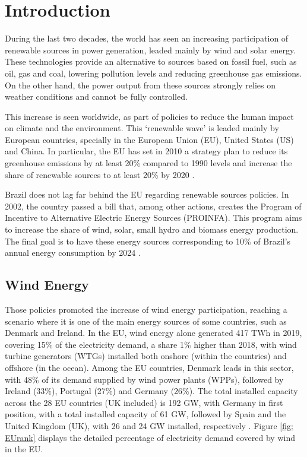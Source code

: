 \chapter[Introduction]{Introduction}
\label{ch: Intro}

During the last two decades, the world has seen an increasing participation of renewable sources in power generation, leaded mainly by wind and solar energy. These technologies provide an alternative to sources based on fossil fuel, such as oil, gas and coal, lowering pollution levels and reducing greenhouse gas emissions. On the other hand, the power output from these sources strongly relies on weather conditions and cannot be fully controlled.

This increase is seen worldwide, as part of policies to reduce the human impact on climate and the environment. This `renewable wave' is leaded mainly by European countries, specially in the European Union (EU), United States (US) and China. In particular, the EU has set in 2010 a strategy plan to reduce its greenhouse emissions by at least 20\% compared to 1990 levels and increase the share of renewable sources to at least 20\% by 2020 \cite{Europe2020}.

Brazil does not lag far behind the EU regarding renewable sources policies. In 2002, the country passed a bill that, among other actions, creates the Program of Incentive to Alternative Electric Energy Sources (PROINFA). This program aims to increase the share of wind, solar, small hydro and biomass energy production. The final goal is to have these energy sources corresponding to 10\% of Brazil's annual energy consumption by 2024 \cite{Brazil2002}.

\section{Wind Energy}

Those policies promoted the increase of wind energy participation, reaching a scenario where it is one of the main energy sources of some countries, such as Denmark and Ireland. In the EU, wind energy alone generated 417 TWh in 2019, covering 15\% of the electricity demand, a share 1\% higher than 2018, with wind turbine generators (WTGs) installed both onshore (within the countries) and offshore (in the ocean). Among the EU countries, Denmark leads in this sector, with 48\% of its demand supplied by wind power plants (WPPs), followed by Ireland (33\%), Portugal (27\%) and Germany (26\%). The total installed capacity across the 28 EU countries (UK included) is 192 GW, with Germany in first position, with a total installed capacity of 61 GW, followed by Spain and the United Kingdom (UK), with 26 and 24 GW installed, respectively \cite{WindEurope2020}. Figure \ref{fig: EUrank} displays the detailed percentage of electricity demand covered by wind in the EU.

